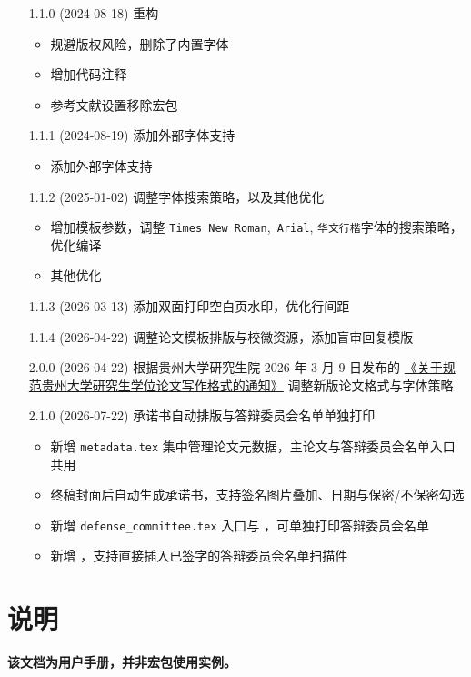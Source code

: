 \documentclass{ctxdoc}
\begin{document}
\begin{itemize}
        \item[1.1.0] (2024-08-18) 重构
        \begin{itemize}
            \item 规避版权风险，删除了内置字体
            \item 增加代码注释
            \item 参考文献设置移除宏包
        \end{itemize}
        \item[1.1.1] (2024-08-19) 添加外部字体支持
        \begin{itemize}
            \item 添加外部字体支持
        \end{itemize}
        \item[1.1.2] (2025-01-02) 调整字体搜索策略，以及其他优化
        \begin{itemize}
            \item 增加模板参数，调整 \texttt{Times New Roman},\texttt{ Arial}, \texttt{华文行楷}字体的搜索策略，优化编译
            \item 其他优化
        \end{itemize}
      \item[1.1.3] (2026-03-13) 添加双面打印空白页水印，优化行间距
      \item[1.1.4] (2026-04-22) 调整论文模板排版与校徽资源，添加盲审回复模版
      \item[2.0.0] (2026-04-22) 根据贵州大学研究生院 2026 年 3 月 9 日发布的
      \href{https://gs.gzu.edu.cn/2026/0309/c11824a265403/page.htm}{《关于规范贵州大学研究生学位论文写作格式的通知》}
      调整新版论文格式与字体策略
      \item[2.1.0] (2026-07-22) 承诺书自动排版与答辩委员会名单单独打印
      \begin{itemize}
          \item 新增 \texttt{metadata.tex} 集中管理论文元数据，主论文与答辩委员会名单入口共用
          \item 终稿封面后自动生成承诺书，支持签名图片叠加、日期与保密/不保密勾选
          \item 新增 \texttt{defense\_committee.tex} 入口与 ，可单独打印答辩委员会名单
          \item 新增 ，支持直接插入已签字的答辩委员会名单扫描件
      \end{itemize}
        
    \end{itemize}


    \section{说明}
    \textbf{该文档为用户手册，并非宏包使用实例。}
\end{document}
